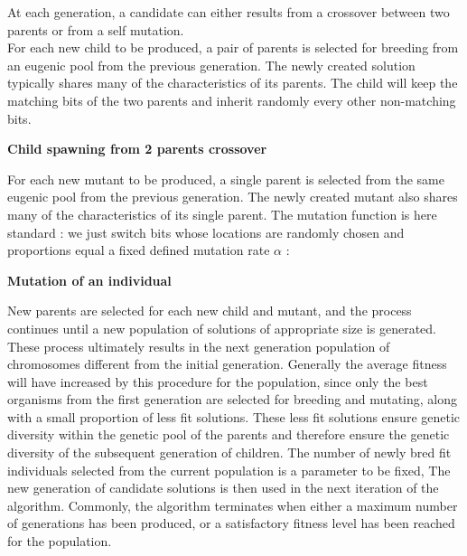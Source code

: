 \documentclass{iSWAGArticle}
\begin{document}
  At each generation, a candidate can either results from a crossover between two parents or from a self mutation.
  \\\newline
  For each new child to be produced, a pair of parents is selected for breeding from an eugenic pool from the previous generation. 
  The newly created solution typically shares many of the characteristics of its parents. 
  The child will keep the matching bits of the two parents and inherit randomly every other non-matching bits.
  \begin{center}
  \textbf{\large Child spawning from 2 parents crossover}
  \end{center}
  \begin{center}
  \end{center}
  For each new mutant to be produced, a single parent is selected from the same eugenic pool from the previous generation. 
  The newly created mutant also shares many of the characteristics of its single parent. 
  The mutation function is here standard : we just switch bits whose locations are randomly chosen
  and proportions equal a fixed defined mutation rate $\alpha$ : 
  \\\newline
  \begin{center}
  \textbf{\large Mutation of an individual}
  \end{center}
  \begin{center}
  \end{center}
  New parents are selected for each new child and mutant, and the process continues until a new population of solutions of appropriate size is generated.
  These process ultimately results in the next generation population of chromosomes different from the initial generation. 
  Generally the average fitness will have increased by this procedure for the population, 
  since only the best organisms from the first generation are selected for breeding and mutating, along with a small proportion of less fit solutions.
  These less fit solutions ensure genetic diversity within the genetic pool of the parents and therefore ensure the genetic diversity of the subsequent generation of children.
  The number of newly bred fit individuals selected from the current population is a parameter to be fixed, 
  The new generation of candidate solutions is then used in the next iteration of the algorithm. 
  Commonly, the algorithm terminates when either a maximum number of generations has been produced, or a satisfactory fitness level has been reached for the population.
\end{document}
